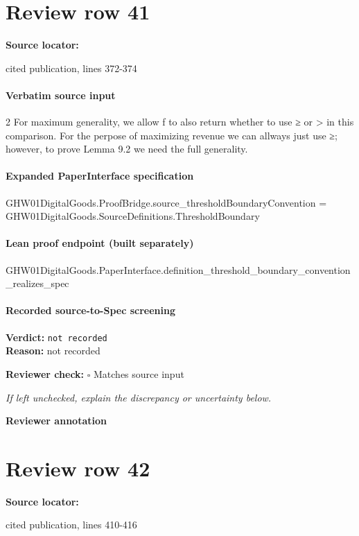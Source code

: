 \documentclass[10pt]{article}
\newcommand{\reviewerbox}{%
  \par\noindent\fbox{\parbox{0.96\linewidth}{\rule{0pt}{0.38in}}}\par
}
\newcommand{\reviewmatch}[1]{%
  \par\noindent\textbf{Reviewer check:} $\square$\; #1\par
  \noindent\emph{If left unchecked, explain the discrepancy or uncertainty below.}\par
}
\begin{document}
\section*{Review row 41}
\textbf{Source locator:} {\footnotesize\raggedright cited publication, lines 372-\allowbreak{}374\par}
\paragraph{Verbatim source input}
\begin{ReviewVerbatim}
2 For maximum generality, we allow f to also return whether
to use ≥ or > in this comparison. For the perpose of maximizing revenue we can allways just use ≥; however, to prove
Lemma 9.2 we need the full generality.
\end{ReviewVerbatim}


\paragraph{Expanded PaperInterface specification}
\begin{ReviewVerbatim}
GHW01DigitalGoods.ProofBridge.source_thresholdBoundaryConvention = GHW01DigitalGoods.SourceDefinitions.ThresholdBoundary
\end{ReviewVerbatim}

\paragraph{Lean proof endpoint (built separately)}\begin{ReviewVerbatim}
GHW01DigitalGoods.PaperInterface.definition_threshold_boundary_convention_realizes_spec
\end{ReviewVerbatim}

\paragraph{Recorded source-to-Spec screening}
\textbf{Verdict:} \texttt{not recorded}
\\
\textbf{Reason:} not recorded
\reviewmatch{Matches source input}
\noindent\textbf{Reviewer annotation}\par
\reviewerbox
\clearpage
\hypertarget{source-claim-22cf85b32833d663}{}
\section*{Review row 42}
\textbf{Source locator:} {\footnotesize\raggedright cited publication, lines 410-\allowbreak{}416\par}
\end{document}
